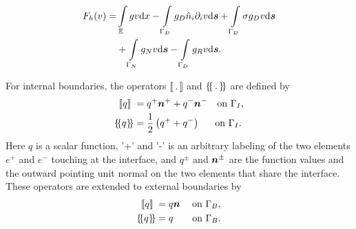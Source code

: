 \begin{align}
  \label{equationFh}
\nonumber
F_h(v) =&
\int\displaylimits_\mathbb{E} gv \mathrm{d}x
- \int\displaylimits_{\Gamma_D}g_D \hat n_i \partial_i v \mathrm{d}\boldsymbol{s} + \int\displaylimits_{\Gamma_D}\sigma g_D v \mathrm{d}\boldsymbol{s} \\
&+ \int\displaylimits_{\Gamma_N}g_Nv\mathrm{d}\boldsymbol{s} -  \int\displaylimits_{\Gamma_D}g_Rv \mathrm{d}\boldsymbol{s}.
\end{align}
%



For internal boundaries, the operators $\llbracket\,.\, \rrbracket$ and $\dgal*{\,.\,}$ are
 defined by
\begin{align}
\label{eq:20}
  \llbracket q \rrbracket\; &= q^{+}\tv n^{+} + q^{-}\tv n^{-} \quad\mbox{on $\Gamma_I$}, \\
  \dgal*{q} &= \frac{1}{2}\left( q^{+} + q^{-}\right) \quad\;\;\mbox{on $\Gamma_I$}.
\end{align}
%
Here $q$ is a scalar function, '+' and '-' is an arbitrary labeling of the two elements $e^+$ and $e^-$ touching at the interface, and 
$q^\pm$ and $\boldsymbol{n}^\pm$ are the function values and the outward
pointing unit normal on the two elements that share the
interface. These operators are extended to external boundaries by
%
\begin{align}
  \llbracket q\rrbracket\; &= q\tv n\quad\;\mbox{on $\Gamma_B$},\\
  \dgal*{q} &= q\quad\;\;\;\,\mbox{on $\Gamma_B$}.
\end{align}


